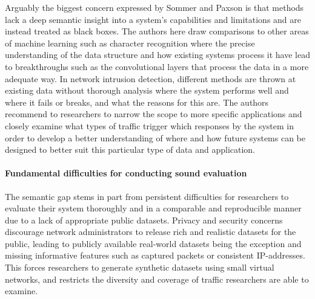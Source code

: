 \documentclass{article}
\begin{document}
Arguably the biggest concern expressed by Sommer and Paxson is that methods lack a deep semantic insight into a system's capabilities and limitations and are instead treated as black boxes. The authors here draw comparisons to other areas of machine learning such as character recognition where the precise understanding of the data structure and how existing systems process it have lead to breakthroughs such as the convolutional layers that process the data in a more adequate way. In network intrusion detection, different methods are thrown at existing data without thorough analysis where the system performs well and where it fails or breaks, and what the reasons for this are. The authors recommend to researchers to narrow the scope to more specific applications and closely examine what types of traffic trigger which responses by the system in order to develop a better understanding of where and how future systems can be designed to better suit this particular type of data and application. 


%
%
%
%
%


\paragraph{Fundamental difficulties for conducting sound evaluation}

The semantic gap stems in part from persistent difficulties for researchers to evaluate their system thoroughly and in a comparable and reproducible manner due to a lack of appropriate public datasets. Privacy and security concerns discourage network administrators to release rich and realistic datasets for the public,  leading to publicly available real-world datasets being the exception and missing informative features such as captured packets or consistent IP-addresses. This forces researchers to generate synthetic datasets using small virtual networks, and restricts the diversity and coverage of traffic researchers are able to examine.
\end{document}
